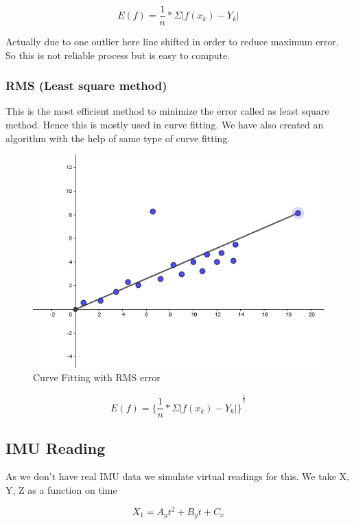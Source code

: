 \begin{equation}
E(f)=\frac{1}{n}*\Sigma|f(x_k)-Y_k| 
\end{equation}

Actually due to one outlier here line shifted in order to reduce maximum error. So this is not reliable process but is easy to compute.

\subsubsection{RMS (Least square method)}
This is the most efficient method to minimize the error called as least square method.
Hence this is mostly used in curve fitting.
We have also created an algorithm with the help of same type of curve fitting.

\begin{figure}[!htb]
\includegraphics[width=\textwidth]{./figures/RMS.PNG}
\caption{Curve Fitting with RMS error }
\end{figure}

\begin{equation}
E(f)={\lbrace\frac{1}{n}*\Sigma|f(x_k)-Y_k|\rbrace}^\frac{1}{2} 
\end{equation}

\subsection{IMU Reading}
As we don’t have real IMU data we simulate virtual readings for this. We take X, Y, Z as a function on time 

\begin{equation}
\label{For_x}
X_1=A_y t^2+B_y t +C_x
\end{equation}

